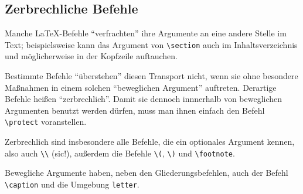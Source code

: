 \subsection{Zerbrechliche Befehle}
 
Manche \LaTeX-Befehle "`verfrachten"' ihre Argumente an eine andere
Stelle im Text; beispielsweise kann das Argument von \verb|\section|
auch im Inhaltsverzeichnis und möglicherweise in der Kopfzeile auftauchen.  

Bestimmte Befehle "`überstehen"' diesen Transport nicht, wenn sie
ohne besondere Maßnahmen in einem solchen "`beweglichen Argument"'
auftreten.
Derartige Befehle heißen "`zerbrechlich"'.  Damit sie dennoch innnerhalb
von beweglichen Argumenten benutzt werden dürfen, 
muss man ihnen einfach den Befehl \verb|\protect| voranstellen.

Zerbrechlich sind insbesondere alle Befehle, die ein optionales Argument
kennen, also auch \verb|\\| (sic!),
außerdem die Befehle \verb|\(|, \verb|\)| und \verb|\footnote|.

Bewegliche Argumente haben, neben den Gliederungsbefehlen,
auch der Befehl \verb|\caption| und die Umgebung \texttt{letter}.


\endinput
